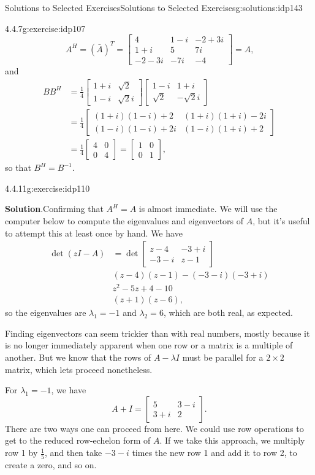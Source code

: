 \documentclass[oneside,10pt,]{book}
\newcommand{\blocktitlefont}{\relax}
\numberwithin{equation}{section}
\newcommand{\bbm}{\begin{bmatrix}}
\newcommand{\ebm}{\end{bmatrix}}
\newcommand{\amp}{&}
\begin{document}
\begin{solutions-chapter}{Solutions to Selected Exercises}{}{Solutions to Selected Exercises}{}{}{g:solutions:idp143}
\begin{inlinesolution}{4.4.7}{}{g:exercise:idp107}
\begin{equation*}
A^H = (\bar{A})^T = \bbm 4\amp 1-i\amp -2+3i\\1+i\amp 5\amp 7i\\-2-3i\amp -7i\amp -4\ebm = A\text{,}
\end{equation*}
and%
\begin{align*}
BB^H \amp =\frac14\bbm 1+i\amp \sqrt{2}\\1-i\amp\sqrt{2}i\ebm\bbm 1-i\amp 1+i\\\sqrt{2}\amp-\sqrt{2}i\ebm \\
\amp =\frac14\bbm (1+i)(1-i)+2\amp (1+i)(1+i)-2i\\(1-i)(1-i)+2i\amp (1-i)(1+i)+2\ebm\\
\amp =\frac14\bbm 4\amp 0\\0\amp 4\ebm = \bbm 1\amp 0\\0\amp 1\ebm\text{,}
\end{align*}
so that \(B^H = B^{-1}\).%
\end{inlinesolution}%
\begin{inlinesolution}{4.4.11}{}{g:exercise:idp110}%
\par\smallskip%
\noindent\textbf{\blocktitlefont Solution}.\hypertarget{g:solution:idp174-back}{}\quad{}Confirming that \(A^H=A\) is almost immediate. We will use the computer below to compute the eigenvalues and eigenvectors of \(A\), but it's useful to attempt this at least once by hand. We have%
\begin{align*}
\det(zI-A) \amp = \det\bbm z-4 \amp -3+i\\-3-i\amp z-1\ebm\\
\amp (z-4)(z-1)-(-3-i)(-3+i)\\
\amp z^2-5z+4-10\\
\amp (z+1)(z-6)\text{,}
\end{align*}
so the eigenvalues are \(\lambda_1=-1\) and \(\lambda_2=6\), which are both real, as expected.%
\par
Finding eigenvectors can seem trickier than with real numbers, mostly because it is no longer immediately apparent when one row or a matrix is a multiple of another. But we know that the rows of \(A-\lambda I\) must be parallel for a \(2\times 2\) matrix, which lets proceed nonetheless.%
\par
For \(\lambda_1=-1\), we have%
\begin{equation*}
A + I =\bbm 5 \amp 3-i\\3+i\amp 2\ebm\text{.}
\end{equation*}
There are two ways one can proceed from here. We could use row operations to get to the reduced row-echelon form of \(A\). If we take this approach, we multiply row 1 by \(\frac15\), and then take \(-3-i\) times the new row 1 and add it to row 2, to create a zero, and so on.%

\end{inlinesolution}
\end{solutions-chapter}
\end{document}
